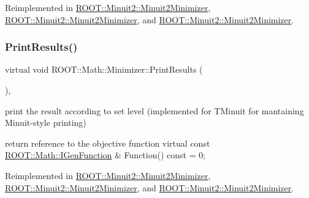 Reimplemented in \mbox{\hyperlink{classROOT_1_1Minuit2_1_1Minuit2Minimizer_a0caadc2005eac5d87fc7345bd54decf0}{R\+O\+O\+T\+::\+Minuit2\+::\+Minuit2\+Minimizer}}, \mbox{\hyperlink{classROOT_1_1Minuit2_1_1Minuit2Minimizer_a0caadc2005eac5d87fc7345bd54decf0}{R\+O\+O\+T\+::\+Minuit2\+::\+Minuit2\+Minimizer}}, and \mbox{\hyperlink{classROOT_1_1Minuit2_1_1Minuit2Minimizer_a0caadc2005eac5d87fc7345bd54decf0}{R\+O\+O\+T\+::\+Minuit2\+::\+Minuit2\+Minimizer}}.

\mbox{\label{classROOT_1_1Math_1_1Minimizer_aea1c5d69c6a1c1f2cf4d17a523862560}} 
\subsubsection{\texorpdfstring{PrintResults()}{PrintResults()}\hspace{0.1cm}{\footnotesize\ttfamily [2/3]}}
{\footnotesize\ttfamily virtual void R\+O\+O\+T\+::\+Math\+::\+Minimizer\+::\+Print\+Results (\begin{DoxyParamCaption}{ }\end{DoxyParamCaption})\hspace{0.3cm}{\ttfamily [inline]}, {\ttfamily [virtual]}}



print the result according to set level (implemented for T\+Minuit for mantaining Minuit-\/style printing) 

return reference to the objective function virtual const \mbox{\hyperlink{namespaceROOT_1_1Math_afe6400b4439b79d54c41fb9f5c5af171}{R\+O\+O\+T\+::\+Math\+::\+I\+Gen\+Function}} \& Function() const = 0; 

Reimplemented in \mbox{\hyperlink{classROOT_1_1Minuit2_1_1Minuit2Minimizer_a0caadc2005eac5d87fc7345bd54decf0}{R\+O\+O\+T\+::\+Minuit2\+::\+Minuit2\+Minimizer}}, \mbox{\hyperlink{classROOT_1_1Minuit2_1_1Minuit2Minimizer_a0caadc2005eac5d87fc7345bd54decf0}{R\+O\+O\+T\+::\+Minuit2\+::\+Minuit2\+Minimizer}}, and \mbox{\hyperlink{classROOT_1_1Minuit2_1_1Minuit2Minimizer_a0caadc2005eac5d87fc7345bd54decf0}{R\+O\+O\+T\+::\+Minuit2\+::\+Minuit2\+Minimizer}}.

\mbox{\label{classROOT_1_1Math_1_1Minimizer_aea1c5d69c6a1c1f2cf4d17a523862560}} 
